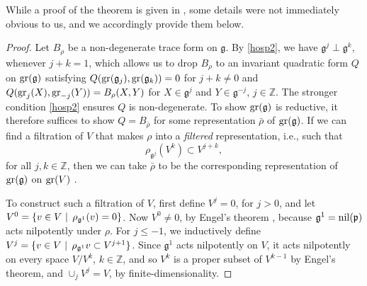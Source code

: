 \documentclass[leqno,12pt]{amsart} %
\begin{document}
While a proof of the theorem is given in \cite{Calderbank_Noppakaew_16}, some details were
not immediately obvious to us, and we accordingly provide them below.
\begin{proof}

  Let $B_\rho $ be a non-degenerate trace form on ${\mathfrak g} $. By \eqref{hosp2}, we
  have ${\mathfrak g}^j \perp {\mathfrak g}^k$, whenever $j + k =1$, which allows us to
  drop $B_\rho$ to an invariant quadratic form $Q$ on $\operatorname{\operatorname{gr}}({\mathfrak g})$ satisfying
  $Q(\operatorname{\operatorname{gr}}({\mathfrak g}_j), \operatorname{\operatorname{gr}}({\mathfrak g}_k)) = 0$ for $j + k \ne 0$ and
  $Q(\operatorname{\operatorname{gr}}_j(X), \operatorname{\operatorname{gr}}_{-j}(Y)) = B_\rho(X, Y)$ for $X \in {\mathfrak g}^j$ and
  $Y \in {\mathfrak g}^{-j}$, $j \in {\mathbb Z}$. The stronger condition \eqref{hosp2}
  ensures $Q$ is non-degenerate. To show $\operatorname{\operatorname{gr}}({\mathfrak g})$ is reductive, it
  therefore suffices to show $Q=B_{\bar \rho}$ for some representation $\bar\rho$ of
  $\operatorname{\operatorname{gr}}({\mathfrak g})$. If we can find a filtration of $V$ that makes $\rho $ into a
  {\em filtered} representation, i.e., such that
  \begin{equation}\label{dep}
        \rho_{{\mathfrak g}^j}(V^k) \subset V^{j+k},
  \end{equation}
  for all $j, k \in {\mathbb Z} $, then we can take $\bar \rho $ to be the corresponding
  representation of $\operatorname{\operatorname{gr}}({\mathfrak g})$ on $\operatorname{\operatorname{gr}}(V)$ \cite[Proposition
  2.14]{Calderbank_Noppakaew_16}.

  To construct such a filtration of $V$, first define $V^j=0$, for $j>0$, and let
  $V^0 = \{v \in V \,\left\vert\right.\, \rho_{{\mathfrak g}^1}(v) = 0\}$. Now $V^0\ne 0$, by Engel's
  theorem \cite[Lemma 2.7]{Calderbank_Noppakaew_16}, because
  ${\mathfrak g}^1=\operatorname{\operatorname{nil}}({\mathfrak p})$ acts nilpotently under $\rho $. For $j\le -1$, we
  inductively define $V^j=\{v \in V\,\left\vert\right.\, \rho_{{\mathfrak g}^1}v \subset
  V^{j+1}\}$. Since ${\mathfrak g}^1$ acts nilpotently on $V$, it acts nilpotently on
  every space $V/V^k$, $k \in {\mathbb Z} $, and so $V^k$ is a proper subset of $V^{k-1}$
  by Engel's theorem, and $\cup_j V^j =V$, by finite-dimensionality.


\end{proof}
\end{document}

